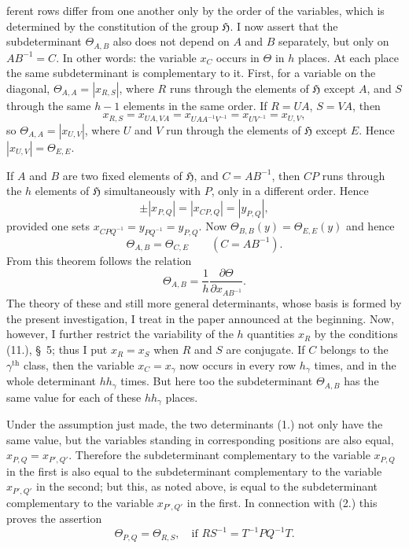 \documentclass[11pt]{article}
\newcommand{\grp}{\mathfrak{H}}
\begin{document}
ferent rows differ from one another only by the order of the variables, which is determined by the constitution of the group $\grp$. I now assert that the subdeterminant $\Theta_{A,B}$ also does not depend on $A$ and $B$ separately, but only on $AB^{-1}=C$. In other words: the variable $x_C$ occurs in $\Theta$ in $h$ places. At each place the same subdeterminant is complementary to it. First, for a variable on the diagonal, $\Theta_{A,A}=\left|x_{R,S}\right|$, where $R$ runs through the elements of $\grp$ except $A$, and $S$ through the same $h-1$ elements in the same order. If $R=UA$, $S=VA$, then
\[
x_{R,S}=x_{UA,VA}=x_{UAA^{-1}V^{-1}}=x_{UV^{-1}}=x_{U,V},
\]
so $\Theta_{A,A}=\left|x_{U,V}\right|$, where $U$ and $V$ run through the elements of $\grp$ except $E$. Hence $\left|x_{U,V}\right|=\Theta_{E,E}$.

If $A$ and $B$ are two fixed elements of $\grp$, and $C=AB^{-1}$, then $CP$ runs through the $h$ elements of $\grp$ simultaneously with $P$, only in a different order. Hence
\[
\pm\left|x_{P,Q}\right|=\left|x_{CP,Q}\right|=\left|y_{P,Q}\right|,
\]
provided one sets $x_{CPQ^{-1}}=y_{PQ^{-1}}=y_{P,Q}$. Now $\Theta_{B,B}(y)=\Theta_{E,E}(y)$ and hence
\begin{equation*}\tag{2.}
\Theta_{A,B}=\Theta_{C,E}\qquad(C=AB^{-1}).
\end{equation*}
From this theorem follows the relation
\begin{equation*}\tag{3.}
\Theta_{A,B}=\frac{1}{h}\frac{\partial\Theta}{\partial x_{AB^{-1}}}.
\end{equation*}
The theory of these and still more general determinants, whose basis is formed by the present investigation, I treat in the paper announced at the beginning. Now, however, I further restrict the variability of the $h$ quantities $x_R$ by the conditions (11.), \S~5; thus I put $x_R=x_S$ when $R$ and $S$ are conjugate. If $C$ belongs to the $\gamma^{\text{th}}$ class, then the variable $x_C=x_\gamma$ now occurs in every row $h_\gamma$ times, and in the whole determinant $h h_\gamma$ times. But here too the subdeterminant $\Theta_{A,B}$ has the same value for each of these $h h_\gamma$ places.

Under the assumption just made, the two determinants (1.) not only have the same value, but the variables standing in corresponding positions are also equal, $x_{P,Q}=x_{P',Q'}$. Therefore the subdeterminant complementary to the variable $x_{P,Q}$ in the first is also equal to the subdeterminant complementary to the variable $x_{P',Q'}$ in the second; but this, as noted above, is equal to the subdeterminant complementary to the variable $x_{P',Q'}$ in the first. In connection with (2.) this proves the assertion
\begin{equation*}\tag{4.}
\Theta_{P,Q}=\Theta_{R,S},\quad \text{if } RS^{-1}=T^{-1}PQ^{-1}T.
\end{equation*}
\end{document}
